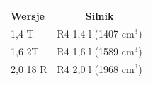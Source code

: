 \documentclass[a4paper,12pt]{article}
\begin{document}
\begin{table}
\begin{tabular}{lc}
\hline
\textbf{Wersje}&\textbf{Silnik}\\
\hline
1,4 T & R4 1{,}4 l (1407 cm$^3$)\\
1,6 2T & R4 1{,}6 l (1589 cm$^3$)\\
2,0 18 R & R4 2{,}0 l (1968 cm$^3$)\\
\hline
\end{tabular}
\end{table}
\end{document}
